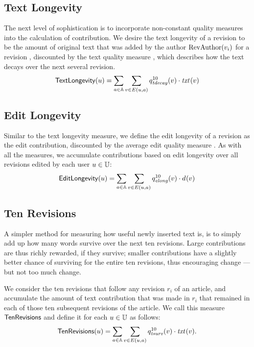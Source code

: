 \subsection{Text Longevity}

\noindent
The next level of sophistication is to incorporate
non-constant quality measures into the calculation of contribution.
We desire the text longevity of a revision to be
the amount of original text that was
added by the author $\mathrm{RevAuthor}(v_{i})$
for a revision , discounted by the
text quality measure , which describes
how the text decays over the next several revision.
%
\[
\textlong(u) =
\sum_{a \in \articles} \sum_{v \in E(u, a)} \quality{tdecay}{10}{v}
        \cdot \txt{}{v}
\]
%

\subsection{Edit Longevity}

\noindent
Similar to the text longevity measure, we define the edit longevity
of a revision  as the edit contribution, discounted by the
average edit quality measure .
As with all the measures, we accumulate contributions based on
edit longevity over all revisions edited by each user $u \in \mathbb{U}$:
%
\[
\editlong(u) = \sum_{a \in \articles} \sum_{v \in E(u, a)}
\quality{elong}{10}{v} \cdot \dist{}{v}
\]
%

\subsection{Ten Revisions}

\noindent
A simpler method for measuring how useful newly inserted
text is, is to simply add up how many words survive over
the next ten revisions.
Large contributions are thus richly rewarded, if they survive;
smaller contributions have a slightly better chance of surviving
for the entire ten revisions, thus encouraging change ---
but not too much change.

We consider the ten revisions that follow any revision $r_i$ of an
article, and accumulate the amount of text contribution that was made
in $r_i$ that remained in each of those ten subsequent revisions
of the article.
We call this measure $\tenrevs$ and define it for each
$u \in \mathbb{U}$ as follows:
%
\begin{gather*}
\tenrevs(u) =
\sum_{a \in \articles} \sum_{v \in E(u, a)} \quality{tsurv}{10}{v}
        \cdot \txt{}{v}.
\end{gather*}

